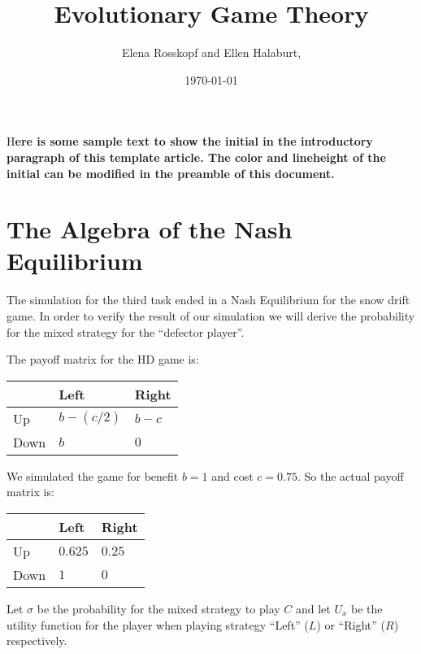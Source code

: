 \documentclass[DIV=calc, paper=a4, fontsize=11pt, twocolumn]{scrartcl}	 %
\title{Evolutionary Game Theory} %
\author{Elena Rosskopf and Ellen Halaburt, } %
\date{\today} %
\newcommand{\initial}[1]{ %
\lettrine[lines=3,lhang=0.3,nindent=0em]{
\color{DarkGoldenrod}
{\textsf{#1}}}{}}
\begin{document}
\maketitle %

\thispagestyle{fancy} %


\initial{H}\textbf{ere is some sample text to show the initial in the introductory paragraph of this template article. The color and lineheight of the initial can be modified in the preamble of this document.}


\section*{The Algebra of the Nash Equilibrium}

The simulation for the third task ended in a Nash Equilibrium
for the snow drift game. In order to verify the result of our
simulation we will derive the probability for the mixed strategy
for the ``defector player''.


The payoff matrix for the HD game is:

\begin{tabular}{l|ll}
  & Left & Right \\
\midrule
Up & $b-(c/2)$ & $b-c$ \\
Down & $b$ & $0$ \\
\end{tabular}

We simulated the game for benefit $b=1$ and cost $c=0.75$.
So the actual payoff matrix is:

\begin{tabular}{l|ll}
  & Left & Right \\
\midrule
Up & $0.625$ & $0.25$ \\
Down & $1$ & $0$ \\
\end{tabular}

Let $\sigma$ be the probability for the mixed strategy
to play $C$ and let $U_x$ be the utility function for the
player when playing strategy ``Left'' ($L$) or ``Right'' ($R$)
respectively.
\end{document}
